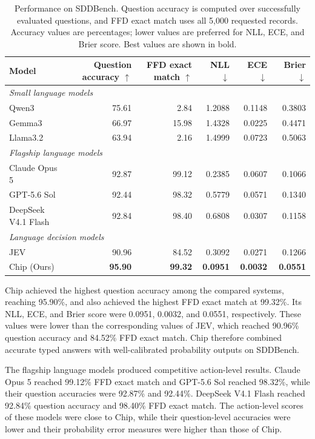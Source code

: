 \documentclass[a4paper,fleqn]{cas-dc}
\begin{document}
\begin{table}[t]
\caption{Performance on SDDBench. Question accuracy is computed over successfully
evaluated questions, and FFD exact match uses all 5,000 requested records. Accuracy values are percentages; lower values
are preferred for NLL, ECE, and Brier score. Best values are shown in bold.}
\label{tab:benchmark-outline}
\centering
\begin{tabular*}{\tblwidth}{@{\extracolsep{\fill}}lrrrrr@{}}
\toprule
Model & Question accuracy $\uparrow$ & FFD exact match $\uparrow$ & NLL $\downarrow$ & ECE $\downarrow$ & Brier $\downarrow$ \\
\midrule
\multicolumn{6}{l}{\textit{Small language models}} \\
Qwen3                 & 75.61 & 2.84  & 1.2088 & 0.1148 & 0.3803 \\
Gemma3                & 66.97 & 15.98 & 1.4328 & 0.0225 & 0.4471 \\
Llama3.2              & 63.94 & 2.16  & 1.4999 & 0.0723 & 0.5063 \\
\hline
\multicolumn{6}{l}{\textit{Flagship language models}} \\
Claude Opus 5         & 92.87 & 99.12 & 0.2385 & 0.0607 & 0.1066 \\
GPT-5.6 Sol           & 92.44 & 98.32 & 0.5779 & 0.0571 & 0.1340 \\
DeepSeek V4.1 Flash   & 92.84 & 98.40 & 0.6808 & 0.0307 & 0.1158 \\
\hline
\multicolumn{6}{l}{\textit{Language decision models}} \\
JEV                   & 90.96 & 84.52 & 0.3092 & 0.0271 & 0.1266 \\
Chip (Ours)       & \textbf{95.90} & \textbf{99.32} & \textbf{0.0951} & \textbf{0.0032} & \textbf{0.0551} \\
\bottomrule
\end{tabular*}
\end{table}

Chip achieved the highest question accuracy among the compared systems,
reaching 95.90\%, and also achieved the highest FFD exact match at
99.32\%. Its NLL, ECE, and Brier score were 0.0951, 0.0032, and 0.0551, respectively. These values were lower than the
corresponding values of JEV, which reached 90.96\% question accuracy and 84.52\%
FFD exact match. Chip therefore combined accurate typed answers
with well-calibrated probability outputs on SDDBench.

The flagship language models produced competitive action-level results. Claude
Opus 5 reached 99.12\% FFD exact match and GPT-5.6 Sol reached 98.32\%, while
their question accuracies were 92.87\% and 92.44\%. DeepSeek V4.1 Flash
reached 92.84\% question accuracy and 98.40\% FFD exact match. The action-level
scores of these models were close to Chip, while their
question-level accuracies were lower and their probability error measures were
higher than those of Chip.
\end{document}
